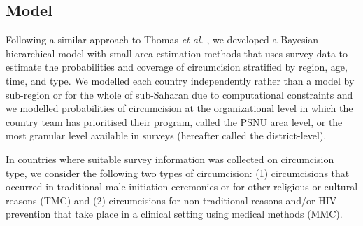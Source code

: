 \documentclass{article}
\begin{document}

\subsection{Model}
\label{sec:org681dda6}


Following a similar approach to Thomas {\it et al.} \cite{thomas2021multilevel}, we developed a Bayesian hierarchical model with small area estimation methods that uses survey data to estimate the probabilities and coverage of circumcision stratified by region, age, time, and type. We modelled each country independently rather than a model by sub-region or for the whole of sub-Saharan due to computational constraints and we modelled probabilities of circumcision at the organizational level in which the country team has prioritised their program, called the PSNU area level, or the most granular level available in surveys (hereafter called the district-level). 

In countries where suitable survey information was collected on circumcision type, we consider the following two types of circumcision: (1) circumcisions that occurred in traditional male initiation ceremonies or for other religious or cultural reasons (TMC) and (2) circumcisions for non-traditional reasons and/or HIV prevention that take place in a clinical setting using medical methods (MMC). 
\end{document}
